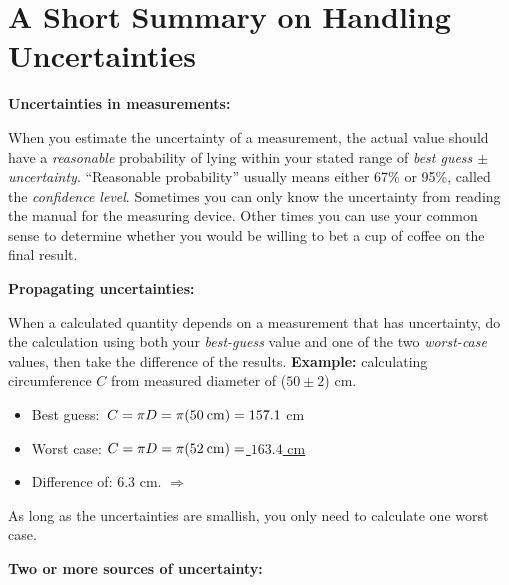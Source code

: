 \section{A Short Summary on Handling Uncertainties}
\label{uncertainty}

\textbf{Uncertainties in measurements:}
\vspace{-.8\parskip}

When you estimate the uncertainty of a measurement, the actual value should have a \textit{reasonable} probability of lying within your stated range of \textit{best guess $\pm$ uncertainty}.  ``Reasonable probability'' usually means either 67\% or 95\%, called the \textit{confidence level}.  Sometimes you can only know the uncertainty from reading the manual for the measuring device.  Other times you can use your common sense to determine whether you would be willing to bet a cup of coffee on the final result.
\vspace{+0.15cm}

\textbf{Propagating uncertainties:}
\vspace{-.8\parskip}

When a calculated quantity depends on a measurement that has uncertainty, do the calculation using both your \textit{best-guess} value and one of the two \textit{worst-case} values, then take the difference of the results.  \textbf{Example:} calculating circumference $C$ from measured diameter of ($50\pm2$) cm.
\begin{itemize}\itemsep1pt
\vspace{-0.35cm}
	\item Best guess: $\,C=\pi D =\pi(50 \:\rm{cm}) = 157.1$ cm
	\item Worst case: $C=\pi D =\pi(52 \:\rm{cm}) =$\underline{ $163.4$  cm}
\vspace{-0.10cm}
	\item Difference of:        \hspace{10.05em}                   6.3 cm. $\Longrightarrow$ 
\end{itemize}
\vspace{-0.35cm}
As long as the uncertainties are smallish, you only need to calculate one worst case.
\vspace{+0.15cm}

\textbf{Two or more sources of uncertainty:}
\vspace{-0.8\parskip}

